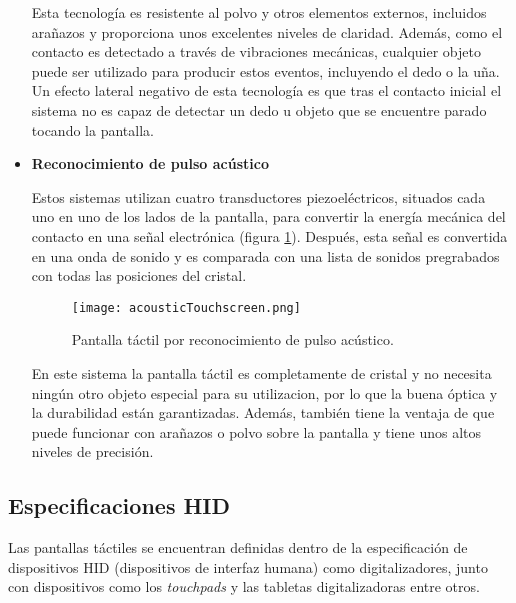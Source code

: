\begin{itemize}
Esta tecnología es resistente al polvo y otros elementos externos, incluidos 
arañazos y proporciona unos excelentes niveles de claridad. Además, como 
el contacto es detectado a través de vibraciones mecánicas, cualquier objeto 
puede ser utilizado para producir estos eventos, incluyendo el dedo o la uña. 
Un efecto lateral negativo de esta tecnología es que tras el contacto inicial 
el sistema no es capaz de detectar un dedo u objeto que se encuentre parado 
tocando la pantalla.

\item \textbf{Reconocimiento de pulso acústico}

Estos sistemas utilizan cuatro transductores piezoeléctricos, situados cada uno 
en uno de los lados de la pantalla, para convertir la energía mecánica del 
contacto en una señal electrónica (figura \ref{fig:acousticTouchscreen}). 
Después, esta señal es convertida en una onda de sonido y es comparada con
una lista de sonidos pregrabados con todas las posiciones del cristal.

  \begin{figure}[h]
    \begin{center}
      \texttt{[image: acousticTouchscreen.png]}
      \caption{Pantalla táctil por reconocimiento de pulso acústico.}
      \label{fig:acousticTouchscreen}
    \end{center}
  \end{figure}

En este sistema la pantalla táctil es completamente de cristal y no necesita 
ningún otro objeto especial para su utilizacion, por lo que la buena óptica y 
la durabilidad están garantizadas. Además, también tiene la ventaja de que
puede funcionar con arañazos o polvo sobre la pantalla y tiene unos altos
niveles de precisión.
\end{itemize}

  \subsection{Especificaciones \acs{HID}}

Las pantallas táctiles se encuentran definidas dentro de la especificación de 
dispositivos \acs{HID} (dispositivos de interfaz humana) como digitalizadores, 
junto con dispositivos como los \emph{touchpads} y las tabletas digitalizadoras 
entre otros.
 
